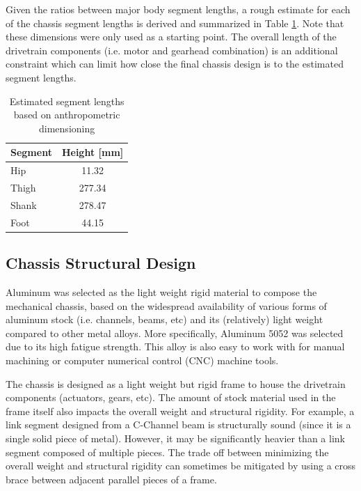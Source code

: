 Given the ratios between major body segment lengths, a rough estimate for each of the chassis segment lengths is derived and summarized in Table \ref{tab:anthropo}. Note that these dimensions were only used as a starting point. The overall length of the drivetrain components (i.e. motor and gearhead combination) is an additional constraint which can limit how close the final chassis design is to the estimated segment lengths.  

\begin{table}[!h]
  \centering
  \caption{Estimated segment lengths based on anthropometric dimensioning}
  \label{tab:anthropo}%
    \begin{tabular}{lc}
    \addlinespace
    \toprule
    \textbf{Segment} & \textbf{Height [mm]} \\
    \midrule
    Hip   & 11.32 \\
    Thigh & 277.34 \\
    Shank & 278.47 \\
    Foot  & 44.15 \\
    \bottomrule
    \end{tabular}%
\end{table}


\subsection{Chassis Structural Design} %
\label{sub:structural_design}
Aluminum was selected as the light weight rigid material to compose the mechanical chassis, based on the widespread availability of various forms of aluminum stock (i.e. channels, beams, etc) and its (relatively) light weight compared to other metal alloys. More specifically, Aluminum 5052 was selected due to its high fatigue strength. This alloy is also easy to work with for manual machining or computer numerical control (CNC) machine tools. 

The chassis is designed as a light weight but rigid frame to house the drivetrain components (actuators, gears, etc). The amount of stock material used in the frame itself also impacts the overall weight and structural rigidity. For example, a link segment designed from a C-Channel beam is structurally sound (since it is a single solid piece of metal). However, it may be significantly heavier than a link segment composed of multiple pieces. The trade off between minimizing the overall weight and structural rigidity can sometimes be mitigated by using a cross brace between adjacent parallel pieces of a frame.  

